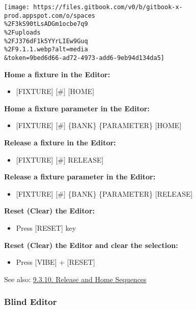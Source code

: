 \documentclass[
]{article}
\providecommand{\tightlist}{%
  \setlength{\itemsep}{0pt}\setlength{\parskip}{0pt}}
\begin{document}
\texttt{[image: https://files.gitbook.com/v0/b/gitbook-x-prod.appspot.com/o/spaces\\\%2F3kS90tLsADGm1ocbe7q9\\\%2Fuploads\\\%2FJ376dF1k5YYrLIEw9Guq\\\%2F9.1.1.webp?alt=media\\\&token=9bed6d66-ad72-4973-add6-9eb94d134da5]}

\textbf{Home a fixture in the Editor:}

\begin{itemize}
\tightlist
\item
  {[}FIXTURE{]} {[}\#{]} {[}HOME{]}
\end{itemize}

\textbf{Home a fixture parameter in the Editor:}

\begin{itemize}
\tightlist
\item
  {[}FIXTURE{]} {[}\#{]} \{BANK\} \{PARAMETER\} {[}HOME{]}
\end{itemize}

\textbf{Release a fixture in the Editor:}

\begin{itemize}
\tightlist
\item
  {[}FIXTURE{]} {[}\#{]} RELEASE{]}
\end{itemize}

\textbf{Release a fixture parameter in the Editor:}

\begin{itemize}
\tightlist
\item
  {[}FIXTURE{]} {[}\#{]} \{BANK\} \{PARAMETER\} {[}RELEASE{]}
\end{itemize}

\textbf{Reset (Clear) the Editor:}

\begin{itemize}
\tightlist
\item
  Press {[}RESET{]} key
\end{itemize}

\textbf{Reset (Clear) the Editor and clear the selection:}

\begin{itemize}
\tightlist
\item
  Press {[}VIBE{]} + {[}RESET{]}
\end{itemize}

See also: \href{https://vibemanual.compulite.com/programming-basics.html\#release-and-home-sequences}{9.3.10. Release and Home Sequences}

\hypertarget{blind-editor}{%
\subsubsection{Blind Editor}\label{blind-editor}}
\end{document}
